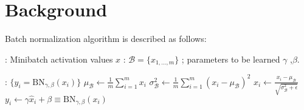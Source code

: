 
\chapter{Background} %

\label{chp:background} %
Batch normalization algorithm is described as follows:



\vspace*{1.3\baselineskip}
\begin{algorithmic}[1]

\REQUIRE : Minibatch activation values $x$ : $\mathcal B = \{x_{1,\ldots,m}\}$ ; parameters to be learned $\gamma$ ,$\beta$.

\ENSURE  : $\{y_i = \mathrm{BN}_{\gamma,\beta}(x_i)\}$
\vspace*{.7\baselineskip}
\STATE $\mu_{\mathcal B} \leftarrow \frac1m \sum_{i = 1}^m x_i$
\vspace*{.7\baselineskip}
\STATE $\sigma^2_{\mathcal B} \leftarrow \frac1m \sum_{i=1}^m (x_i - \mu_{\mathcal B})^2$
\vspace*{.7\baselineskip}
\STATE $\hat x_i \leftarrow \frac{x_i - \mu_{\mathcal B}}{\sqrt{\sigma_{\mathcal B}^2 + \epsilon}}$
\vspace*{.7\baselineskip}
\STATE $y_i \leftarrow \gamma \hat x_i + \beta \equiv \mathrm{BN}_{\gamma,\beta}(x_i)$

\end{algorithmic}